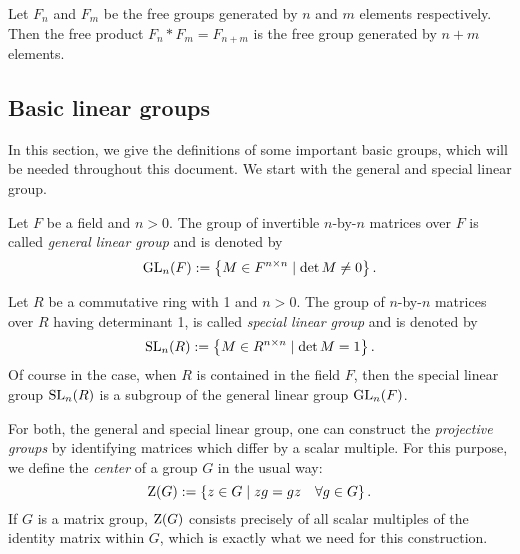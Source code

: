 \begin{example}
Let $F_n$ and $F_m$ be the free groups generated by $n$ and $m$ elements respectively. Then the free product $F_n \ast F_m = F_{n+m}$ is the free group generated by $n+m$ elements.
\end{example}

\subsection{Basic linear groups}
In this section, we give the definitions of some important basic groups, which will be needed throughout this document. We start with the general and special linear group.

\begin{definition}
\label{dfn_GenLinGrp}
Let $F$ be a field and $n > 0$. The group of invertible $n$-by-$n$ matrices over  $F$ is called \emph{general linear group} and is denoted by
\begin{equation}
\label{eqn_GeneralLinearGroup}
\operatorname{GL}_{n}(F) := \left\{M \in {F}^{n \times n} \mid \det M \ne 0\right\}.
\end{equation}
\end{definition}

\begin{definition}
\label{dfn_SpLinGrp}
Let $R$ be a commutative ring with 1 and $n > 0$. The group of $n$-by-$n$ matrices over $R$ having determinant 1, is called \emph{special linear group} and is denoted by
\begin{equation}
\label{eqn_SpecialLinearGroup}
\operatorname{SL}_{n}(R) := \left\{M \in {R}^{n \times n} \mid \det M = 1\right\}.
\end{equation}
Of course in the case, when $R$ is contained in the field $F$, then the special linear group $\operatorname{SL}_{n}(R)$ is a subgroup of the general linear group $\operatorname{GL}_{n}(F)$. 
\end{definition}

For both, the general and special linear group, one can construct the \emph{projective groups} by identifying matrices which differ by a scalar multiple. For this purpose, we define the \emph{center} of a group $G$ in the usual way:
\begin{equation}
\operatorname{Z}(G) := \left\{z \in G \mid zg = gz \quad \forall g \in G\right\}.
\end{equation}
If $G$ is a matrix group, $\operatorname{Z}(G)$ consists precisely of all scalar multiples of the identity matrix within $G$, which is exactly what we need for this construction.

